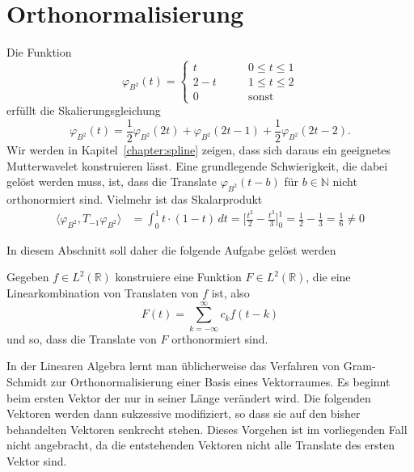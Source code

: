 %
%
%
\section{Orthonormalisierung
\label{section:orthonormalisierung}}
Die Funktion
\[
\varphi_{B^2}(t)
=
\begin{cases}
  t&\qquad 0\le t \le 1\\
2-t&\qquad 1\le t \le 2\\
  0&\qquad \text{sonst}
\end{cases}
\]
erfüllt die Skalierungsgleichung
\begin{equation}
\varphi_{B^2}(t)
= 
\frac12\varphi_{B^2}(2t)
+
\varphi_{B^2}(2t-1)
+
\frac12\varphi_{B^2}(2t-2).
\label{eq:skalierung-phi1-proto}
\end{equation}
Wir werden in Kapitel~\ref{chapter:spline} zeigen, dass sich daraus ein
geeignetes Mutterwavelet konstruieren lässt.
Eine grundlegende Schwierigkeit, die dabei gelöst werden muss, ist, dass
die Translate $\varphi_{B^2}(t-b)$ für $b\in\mathbb N$ nicht orthonormiert
sind.
Vielmehr ist das Skalarprodukt
\begin{align*}
\langle \varphi_{B^2}, T_{-1}\varphi_{B^2}\rangle
&=
\int_0^1 t\cdot (1-t)\,dt
=
\biggl[
\frac{t^2}{2}-\frac{t^3}{3}
\biggl]_0^1
=
\frac12-\frac13 = \frac16\ne 0
\end{align*}


In diesem Abschnitt soll daher die folgende Aufgabe gelöst werden
\begin{aufgabe}
\label{aufgabe:orthonormalisierung}
Gegeben $f\in L^2(\mathbb R)$ konstruiere eine Funktion 
$F\in L^2(\mathbb R)$, die eine Linearkombination von 
Translaten von $f$ ist, also
\[
F(t) = \sum_{k=-\infty}^\infty c_k f(t-k)
\]
und so, dass die Translate von $F$ orthonormiert sind.
\end{aufgabe}

In der Linearen Algebra lernt man üblicherweise das Verfahren von
Gram-Schmidt zur Orthonormalisierung einer Basis eines Vektorraumes.
Es beginnt beim ersten Vektor der nur in seiner Länge verändert wird.
Die folgenden Vektoren werden dann sukzessive modifiziert, so dass sie
auf den bisher behandelten Vektoren senkrecht stehen.
Dieses Vorgehen ist im vorliegenden Fall nicht angebracht, da die
entstehenden Vektoren nicht alle Translate des ersten Vektor sind.

